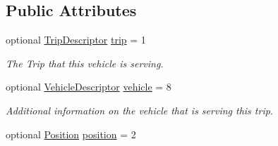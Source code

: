 \subsection*{Public Attributes}
\begin{DoxyCompactItemize}
\item 
optional \hyperlink{structTripDescriptor}{Trip\+Descriptor} \hyperlink{structVehiclePosition_a68605569650190d0c85783f544bc73d4}{trip} = 1
\begin{DoxyCompactList}\small\item\em The Trip that this vehicle is serving. \end{DoxyCompactList}\item 
optional \hyperlink{structVehicleDescriptor}{Vehicle\+Descriptor} \hyperlink{structVehiclePosition_a412e2409241622073e82b6f4a2190ed6}{vehicle} = 8\hypertarget{structVehiclePosition_a412e2409241622073e82b6f4a2190ed6}{}\label{structVehiclePosition_a412e2409241622073e82b6f4a2190ed6}

\begin{DoxyCompactList}\small\item\em Additional information on the vehicle that is serving this trip. \end{DoxyCompactList}\item 
optional \hyperlink{structPosition}{Position} \hyperlink{structVehiclePosition_aad758c3889b783356301a01f99289a64}{position} = 2\hypertarget{structVehiclePosition_aad758c3889b783356301a01f99289a64}{}\label{structVehiclePosition_aad758c3889b783356301a01f99289a64}


\end{DoxyCompactItemize}
